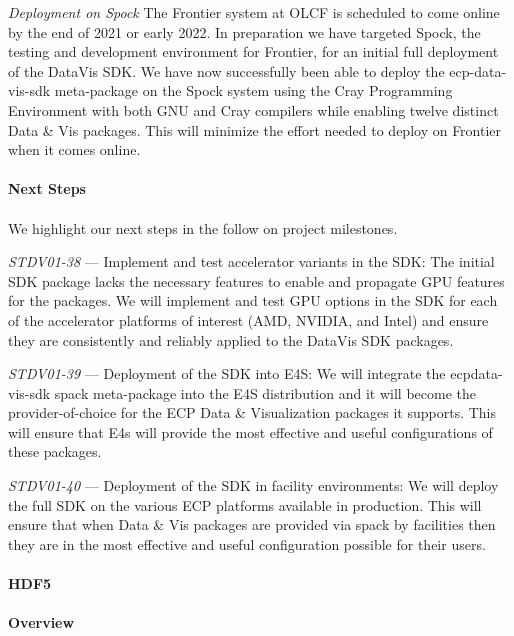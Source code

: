 \textit{Deployment on Spock} The Frontier system at OLCF is scheduled to come online by the end of 2021 or early 2022. In preparation we have targeted Spock, the testing and development environment for Frontier, for an initial full deployment of the DataVis SDK.  We have now successfully been able to deploy the ecp-data-vis-sdk meta-package on the Spock system using the Cray Programming Environment with both GNU and Cray compilers while enabling twelve distinct Data \& Vis packages.  This will minimize the effort needed to deploy on Frontier when it comes online.

\paragraph{\textbf{Next Steps}}
\paragraph{}

We highlight our next steps in the follow on project milestones.

\textit{STDV01-38} --- Implement and test accelerator variants in the SDK: The initial SDK package lacks the necessary features to enable and propagate GPU features for the packages.  We will implement and test GPU options in the SDK for each of the accelerator platforms of interest (AMD, NVIDIA, and Intel) and ensure they are consistently and reliably applied to the DataVis SDK packages.

\textit{STDV01-39} --- Deployment of the SDK into E4S: We will integrate the ecpdata-vis-sdk spack meta-package into the E4S distribution and it will become the provider-of-choice for the ECP Data \& Visualization packages it supports.  This will ensure that E4s will provide the most effective and useful configurations of these packages.

\textit{STDV01-40} --- Deployment of the SDK in facility environments: We will deploy the full SDK on the various ECP platforms available in production.  This will ensure that when Data \& Vis packages are provided via spack by facilities then they are in the most effective and useful configuration possible for their users.

\paragraph{HDF5}
\paragraph{Overview}

